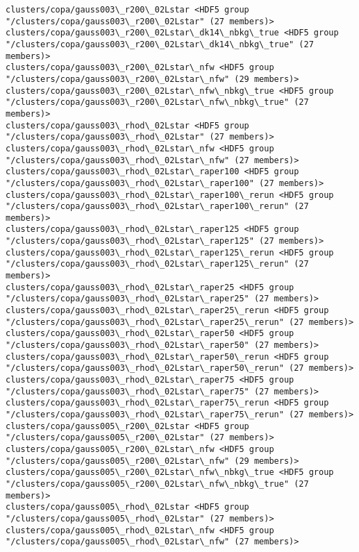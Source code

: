 \documentclass[11pt]{article}
\begin{document}
\begin{Verbatim}[commandchars=\\\{\}]
clusters/copa/gauss003\_r200\_02Lstar <HDF5 group "/clusters/copa/gauss003\_r200\_02Lstar" (27 members)>
clusters/copa/gauss003\_r200\_02Lstar\_dk14\_nbkg\_true <HDF5 group "/clusters/copa/gauss003\_r200\_02Lstar\_dk14\_nbkg\_true" (27 members)>
clusters/copa/gauss003\_r200\_02Lstar\_nfw <HDF5 group "/clusters/copa/gauss003\_r200\_02Lstar\_nfw" (29 members)>
clusters/copa/gauss003\_r200\_02Lstar\_nfw\_nbkg\_true <HDF5 group "/clusters/copa/gauss003\_r200\_02Lstar\_nfw\_nbkg\_true" (27 members)>
clusters/copa/gauss003\_rhod\_02Lstar <HDF5 group "/clusters/copa/gauss003\_rhod\_02Lstar" (27 members)>
clusters/copa/gauss003\_rhod\_02Lstar\_nfw <HDF5 group "/clusters/copa/gauss003\_rhod\_02Lstar\_nfw" (27 members)>
clusters/copa/gauss003\_rhod\_02Lstar\_raper100 <HDF5 group "/clusters/copa/gauss003\_rhod\_02Lstar\_raper100" (27 members)>
clusters/copa/gauss003\_rhod\_02Lstar\_raper100\_rerun <HDF5 group "/clusters/copa/gauss003\_rhod\_02Lstar\_raper100\_rerun" (27 members)>
clusters/copa/gauss003\_rhod\_02Lstar\_raper125 <HDF5 group "/clusters/copa/gauss003\_rhod\_02Lstar\_raper125" (27 members)>
clusters/copa/gauss003\_rhod\_02Lstar\_raper125\_rerun <HDF5 group "/clusters/copa/gauss003\_rhod\_02Lstar\_raper125\_rerun" (27 members)>
clusters/copa/gauss003\_rhod\_02Lstar\_raper25 <HDF5 group "/clusters/copa/gauss003\_rhod\_02Lstar\_raper25" (27 members)>
clusters/copa/gauss003\_rhod\_02Lstar\_raper25\_rerun <HDF5 group "/clusters/copa/gauss003\_rhod\_02Lstar\_raper25\_rerun" (27 members)>
clusters/copa/gauss003\_rhod\_02Lstar\_raper50 <HDF5 group "/clusters/copa/gauss003\_rhod\_02Lstar\_raper50" (27 members)>
clusters/copa/gauss003\_rhod\_02Lstar\_raper50\_rerun <HDF5 group "/clusters/copa/gauss003\_rhod\_02Lstar\_raper50\_rerun" (27 members)>
clusters/copa/gauss003\_rhod\_02Lstar\_raper75 <HDF5 group "/clusters/copa/gauss003\_rhod\_02Lstar\_raper75" (27 members)>
clusters/copa/gauss003\_rhod\_02Lstar\_raper75\_rerun <HDF5 group "/clusters/copa/gauss003\_rhod\_02Lstar\_raper75\_rerun" (27 members)>
clusters/copa/gauss005\_r200\_02Lstar <HDF5 group "/clusters/copa/gauss005\_r200\_02Lstar" (27 members)>
clusters/copa/gauss005\_r200\_02Lstar\_nfw <HDF5 group "/clusters/copa/gauss005\_r200\_02Lstar\_nfw" (29 members)>
clusters/copa/gauss005\_r200\_02Lstar\_nfw\_nbkg\_true <HDF5 group "/clusters/copa/gauss005\_r200\_02Lstar\_nfw\_nbkg\_true" (27 members)>
clusters/copa/gauss005\_rhod\_02Lstar <HDF5 group "/clusters/copa/gauss005\_rhod\_02Lstar" (27 members)>
clusters/copa/gauss005\_rhod\_02Lstar\_nfw <HDF5 group "/clusters/copa/gauss005\_rhod\_02Lstar\_nfw" (27 members)>

\end{Verbatim}
\end{document}
